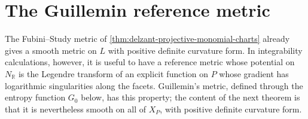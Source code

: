 \section{The Guillemin reference metric}
\label{sec:guillemin-reference-metric}
The Fubini--Study metric of \cref{thm:delzant-projective-monomial-charts} already gives a smooth metric on $L$ with positive definite curvature form. In integrability calculations, however, it is useful to have a reference metric whose potential on $N_{\mathbb R}$ is the Legendre transform of an explicit function on $P$ whose gradient has logarithmic singularities along the facets. Guillemin's metric, defined through the entropy function $G_0$ below, has this property; the content of the next theorem is that it is nevertheless smooth on all of $X_P$, with positive definite curvature form.

